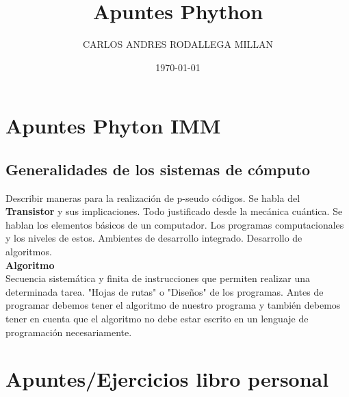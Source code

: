 \documentclass[onecolumn]{article} %
\title{Apuntes Phython}
\author{CARLOS ANDRES RODALLEGA MILLAN}
\date{\today}
\begin{document}
\maketitle %
\section{Apuntes Phyton IMM} %
\subsection{Generalidades de los sistemas de cómputo}
Describir maneras para la realización de p-seudo códigos. 
Se habla del \textbf{Transistor} y sus implicaciones. Todo justificado desde la mecánica cuántica. Se hablan los elementos básicos de un computador. Los programas computacionales y los niveles de estos. Ambientes de desarrollo integrado. Desarrollo de algoritmos. 
\\
\textbf{Algoritmo}\\
Secuencia sistemática y finita de instrucciones que permiten realizar una determinada tarea. "Hojas de rutas" o "Diseños" de los programas. Antes de programar debemos tener el algoritmo de nuestro programa y también debemos tener en cuenta que el algoritmo no debe estar escrito en un lenguaje de programación necesariamente.



\section{Apuntes/Ejercicios libro personal} %
\end{document}
